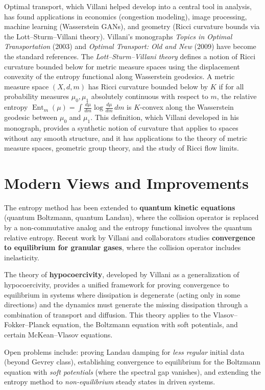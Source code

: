 Optimal transport, which Villani helped develop into a central tool in analysis, has found applications in economics (congestion modeling), image processing, machine learning (Wasserstein GANs), and geometry (Ricci curvature bounds via the Lott--Sturm--Villani theory). Villani's monographs \emph{Topics in Optimal Transportation} (2003) and \emph{Optimal Transport: Old and New} (2009) have become the standard references. The \emph{Lott--Sturm--Villani theory} defines a notion of Ricci curvature bounded below for metric measure spaces using the displacement convexity of the entropy functional along Wasserstein geodesics. A metric measure space $(X, d, m)$ has Ricci curvature bounded below by $K$ if for all probability measures $\mu_0, \mu_1$ absolutely continuous with respect to $m$, the relative entropy $\operatorname{Ent}_m(\mu) = \int \frac{d\mu}{dm} \log \frac{d\mu}{dm} \, dm$ is $K$-convex along the Wasserstein geodesic between $\mu_0$ and $\mu_1$. This definition, which Villani developed in his monograph, provides a synthetic notion of curvature that applies to spaces without any smooth structure, and it has applications to the theory of metric measure spaces, geometric group theory, and the study of Ricci flow limits.

\section{Modern Views and Improvements}\label{ch2010cedricvillani:modern-views-and-improvements}

The entropy method has been extended to \textbf{quantum kinetic equations} (quantum Boltzmann, quantum Landau), where the collision operator is replaced by a non-commutative analog and the entropy functional involves the quantum relative entropy. Recent work by Villani and collaborators studies \textbf{convergence to equilibrium for granular gases}, where the collision operator includes inelasticity.

The theory of \textbf{hypocoercivity}, developed by Villani as a generalization of hypocoercivity, provides a unified framework for proving convergence to equilibrium in systems where dissipation is degenerate (acting only in some directions) and the dynamics must generate the missing dissipation through a combination of transport and diffusion. This theory applies to the Vlasov--Fokker--Planck equation, the Boltzmann equation with soft potentials, and certain McKean--Vlasov equations.

Open problems include: proving Landau damping for \emph{less regular} initial data (beyond Gevrey class), establishing convergence to equilibrium for the Boltzmann equation with \emph{soft potentials} (where the spectral gap vanishes), and extending the entropy method to \emph{non-equilibrium} steady states in driven systems.

